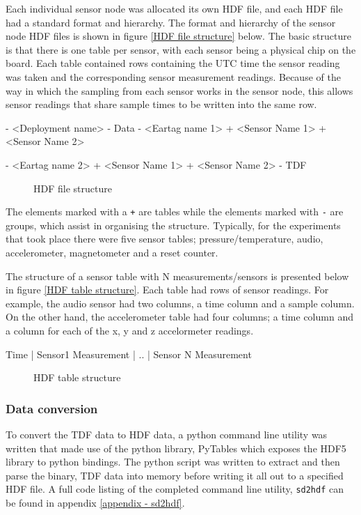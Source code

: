 Each individual sensor node was allocated its own HDF file, and each HDF file had a standard format and hierarchy. The format and hierarchy of the sensor node HDF files is shown in figure \ref{HDF file structure} below. The basic structure is that there is one table per sensor, with each sensor being a physical chip on the board. Each table contained rows containing the UTC time the sensor reading was taken and the corresponding sensor measurement readings. Because of the way in which the sampling from each sensor works in the sensor node, this allows sensor readings that share sample times to be written into the same row.  

\begin{verbbox}
  - <Deployment name> 
    - Data
        - <Eartag name 1>
            + <Sensor Name 1>
            + <Sensor Name 2>

        - <Eartag name 2>
            + <Sensor Name 1>
            + <Sensor Name 2>
    - TDF
\end{verbbox}
\begin{figure}[ht!]
  \centering
  \theverbbox
  \caption{HDF file structure}
\end{figure}

The elements marked with a \texttt{+} are tables while the elements marked with \texttt{-} are groups, which assist in organising the structure. Typically, for the experiments that took place there were five sensor tables; pressure/temperature, audio, accelerometer, magnetometer and a reset counter. 

The structure of a sensor table with N measurements/sensors is presented below in figure \ref{HDF table structure}. Each table had rows of sensor readings. For example, the audio sensor had two columns, a time column and a sample column. On the other hand, the accelerometer table had four columns; a time column and a column for each of the x, y and z accelormeter readings. \\

\begin{verbbox}
Time | Sensor1 Measurement | .. | Sensor N Measurement 
\end{verbbox}
\begin{figure}[ht!]
  \centering
  \theverbbox
  \caption{HDF table structure}
\end{figure}

\subsubsection{Data conversion}
To convert the TDF data to HDF data, a python command line utility was written that made use of the python library, PyTables which exposes the HDF5 library to python bindings. The python script was written to extract and then parse the binary, TDF data into memory before writing it all out to a specified HDF file. A full code listing of the completed command line utility, \texttt{sd2hdf} can be found in appendix \ref{appendix - sd2hdf}. 

